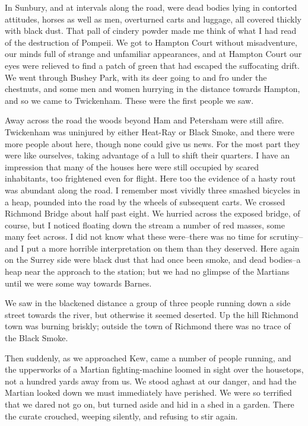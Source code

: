In Sunbury, and at intervals along the road, were dead bodies lying
in contorted attitudes, horses as well as men, overturned carts and
luggage, all covered thickly with black dust. That pall of cindery
powder made me think of what I had read of the destruction of
Pompeii. We got to Hampton Court without misadventure, our minds
full of strange and unfamiliar appearances, and at Hampton Court
our eyes were relieved to find a patch of green that had escaped
the suffocating drift. We went through Bushey Park, with its deer
going to and fro under the chestnuts, and some men and women
hurrying in the distance towards Hampton, and so we came to
Twickenham. These were the first people we saw.

Away across the road the woods beyond Ham and Petersham were still
afire. Twickenham was uninjured by either Heat-Ray or Black Smoke,
and there were more people about here, though none could give us
news. For the most part they were like ourselves, taking advantage
of a lull to shift their quarters. I have an impression that many
of the houses here were still occupied by scared inhabitants, too
frightened even for flight. Here too the evidence of a hasty rout
was abundant along the road. I remember most vividly three smashed
bicycles in a heap, pounded into the road by the wheels of
subsequent carts. We crossed Richmond Bridge about half past eight.
We hurried across the exposed bridge, of course, but I noticed
floating down the stream a number of red masses, some many feet
across. I did not know what these were--there was no time for
scrutiny--and I put a more horrible interpretation on them than
they deserved. Here again on the Surrey side were black dust that
had once been smoke, and dead bodies--a heap near the approach to
the station; but we had no glimpse of the Martians until we were
some way towards Barnes.

We saw in the blackened distance a group of three people running
down a side street towards the river, but otherwise it seemed
deserted. Up the hill Richmond town was burning briskly; outside
the town of Richmond there was no trace of the Black Smoke.

Then suddenly, as we approached Kew, came a number of people
running, and the upperworks of a Martian fighting-machine loomed in
sight over the housetops, not a hundred yards away from us. We
stood aghast at our danger, and had the Martian looked down we must
immediately have perished. We were so terrified that we dared not
go on, but turned aside and hid in a shed in a garden. There the
curate crouched, weeping silently, and refusing to stir again.

